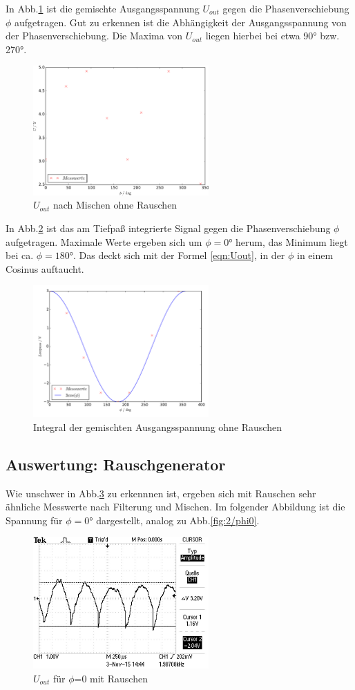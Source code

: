 In Abb.\ref{fig:plot2u} ist die gemischte Ausgangsspannung $U_{out}$ gegen die
Phasenverschiebung $\phi$ aufgetragen. Gut zu erkennen ist die Abhängigkeit
der Ausgangsspannung von der Phasenverschiebung. Die Maxima von $U_{out}$
liegen hierbei bei etwa 90° bzw. 270°.
\begin{figure}[H]
  \centering
  \includegraphics[width=0.6\textwidth, height=0.3\textwidth]{plot2u.pdf}
  \caption{$U_{out}$ nach Mischen ohne Rauschen}
  \label{fig:plot2u}
\end{figure}
\newpage
In Abb.\ref{fig:plot2low} ist das am Tiefpaß integrierte Signal gegen die
Phasenverschiebung $\phi$ aufgetragen. Maximale Werte ergeben sich um $\phi = 0°$
herum, das Minimum liegt bei ca. $\phi = 180°$. Das deckt sich mit der Formel
\eqref{eqn:Uout}, in der $\phi$ in einem Cosinus auftaucht.
\begin{figure}[H]
  \centering
  \includegraphics[height=0.3\textwidth,width=0.6\textwidth]{plot2low.pdf}
  \caption{Integral der gemischten Ausgangsspannung ohne Rauschen}
  \label{fig:plot2low}
\end{figure}


\subsection{Auswertung: Rauschgenerator}

Wie unschwer in Abb.\ref{fig:3/phi0} zu erkennnen ist, ergeben sich mit Rauschen
sehr ähnliche
Messwerte nach Filterung und Mischen. Im folgender Abbildung ist die
Spannung für $\phi=0°$ dargestellt, analog zu Abb.\ref{fig:2/phi0}.

\begin{figure}[H]
  \centering
  \includegraphics[angle=90,width=0.6\textwidth, height=0.3\textwidth]{graphics/ALL0039/F0039TEK.jpg}
  \caption{$U_{out}$ für $\phi$=0 mit Rauschen}
  \label{fig:3/phi0}
\end{figure}

